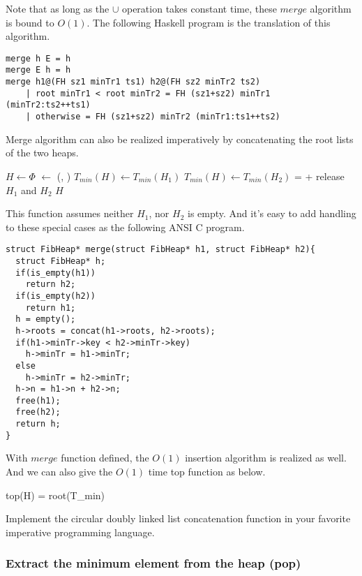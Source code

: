 \documentclass{article}
\begin{document}
Note that as long as the $\cup$ operation takes constant time, these
$merge$ algorithm is bound to $O(1)$. The following Haskell program
is the translation of this algorithm.

\lstset{language=Haskell}
\begin{lstlisting}
merge h E = h
merge E h = h
merge h1@(FH sz1 minTr1 ts1) h2@(FH sz2 minTr2 ts2)
    | root minTr1 < root minTr2 = FH (sz1+sz2) minTr1 (minTr2:ts2++ts1)
    | otherwise = FH (sz1+sz2) minTr2 (minTr1:ts1++ts2)
\end{lstlisting}

Merge algorithm can also be realized imperatively by concatenating
the root lists of the two heaps.

\begin{algorithmic}[1]
  \State $H \gets \Phi$
  \State {} $\gets$ (, )
    \State $T_{min}(H) \gets T_{min}(H_1)$
  \Else
    \State $T_{min}(H) \gets T_{min}(H_2)$
  \EndIf
   =  + 
  \State release $H_1$ and $H_2$
  \State \Return $H$
\EndFunction
\end{algorithmic}

This function assumes neither $H_1$, nor $H_2$ is empty. And it's easy
to add handling to these special cases as the following ANSI C program.

\lstset{language=C}
\begin{lstlisting}
struct FibHeap* merge(struct FibHeap* h1, struct FibHeap* h2){
  struct FibHeap* h;
  if(is_empty(h1))
    return h2;
  if(is_empty(h2))
    return h1;
  h = empty();
  h->roots = concat(h1->roots, h2->roots);
  if(h1->minTr->key < h2->minTr->key)
    h->minTr = h1->minTr;
  else
    h->minTr = h2->minTr;
  h->n = h1->n + h2->n;
  free(h1);
  free(h2);
  return h;
}
\end{lstlisting}

With $merge$ function defined, the $O(1)$ insertion algorithm is realized
as well. And we can also give the $O(1)$ time top function as below.

\be
top(H) = root(T_{min})
\ee

\begin{Exercise}
Implement the circular doubly linked list concatenation function in
your favorite imperative programming language.
\end{Exercise}

\subsubsection{Extract the minimum element from the heap (pop)}
 
\end{document}

